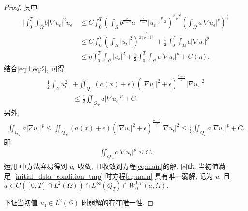 \documentclass[oneside,longtitle]{LZUthesis}
\numberwithin{equation}{chapter}
\newcommand*\abs[1]{\lvert#1\rvert}
\begin{document}
\begin{proof}
	其中
	\begin{equation}\label{eq:2}
		\begin{split}
			\abs{\int_0^T\int_{\Omega} b\abs{\nabla u_{\epsilon}}^2u_{\epsilon}}
			&\leq C\int_0^T\left( \int_{\Omega} b^{\frac{p}{p-2}}a^{-\frac{2}{p-2}}\abs{u_{\epsilon}}^{\frac{p}{p-2}} \right)^{\frac{p-2}{p}}
			\left(  \int_{\Omega} a\abs{\nabla u_{\epsilon}}^p \right)^{\frac{2}{p}}\\
			&\leq C\int_0^T\left(\int_{\Omega}\abs{u_{\epsilon}}^2\right)^{\frac{p}{2(p-2)}} + \frac{1}{2}\int_0^T\int_{\Omega} a\abs{\nabla u_{\epsilon}}^p\\
			&\leq \eta\int_0^T\int_{\Omega}\abs{u_{\epsilon}}^2 + \frac{1}{2}\int_0^T\int_{\Omega} a\abs{\nabla u_{\epsilon}}^p + C(\eta).
		\end{split}
	\end{equation}
	结合\cref{eq:1,eq:2}, 可得
	\begin{equation*}
		\begin{split}
			\frac{1}{2} \int_{\Omega} u_{\epsilon}^{2}
			&+\iint_{Q_{T}}(a(x)+\epsilon)\left(\left|\nabla u_{\epsilon}\right|^{2}+\epsilon\right)^{\frac{p-2}{2}}\left|\nabla u_{\epsilon}\right|^{2}\\
			&\leq \frac{1}{2}\iint_{Q_T}a\abs{\nabla u_\epsilon}^p + C.
		\end{split}
	\end{equation*}
	另外,
	\begin{equation*}
		\begin{split}
			\iint_{Q_T}a\abs{\nabla u_\epsilon}^p
			\leq \iint_{Q_{T}}(a(x)+\epsilon)\left(\left|\nabla u_{\epsilon}\right|^{2}+\epsilon\right)^{\frac{p-2}{2}}\left|\nabla u_{\epsilon}\right|^{2}
			\leq \frac{1}{2}\iint_{Q_T}a\abs{\nabla u_\epsilon}^p + C.
		\end{split}
	\end{equation*}
	即
	\begin{equation}\label{eq:iint_adu}
		\begin{split}
			\iint_{Q_T}a\abs{\nabla u_\epsilon}^p \leq C.
		\end{split}
	\end{equation}
	运用 \cite{Zhan2019Uniquenessa} 中方法容易得到 $u_\epsilon$ 收敛, 且收敛到方程\eqref{eq:main}的解.
	因此, 当初值满足~\eqref{initial_data_condition_tmp} 时方程\eqref{eq:main} 具有唯一弱解, 记为 $u$,
	且 $u \in C([0, T] \cap L^2(\Omega)) \cap L^{\infty}(Q_T) \cap  W_0^{1,p}(a, \Omega)$.

	下证当初值 $u_0 \in L^2(\Omega)$ 时弱解的存在唯一性.


\end{proof}
\end{document}
